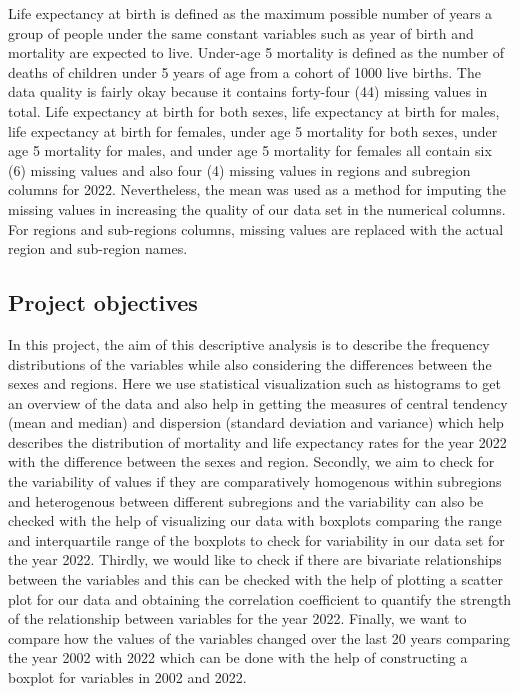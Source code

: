 \documentclass[12 pt]{scrartcl}
\begin{document}
Life expectancy at birth is defined as the maximum possible number of years a group of people under the same constant variables such as year of birth and mortality are expected to live. Under-age 5 mortality is defined as the number of deaths of children under 5 years of age from a cohort of 1000 live births.  The data quality is fairly okay because it contains forty-four (44)  missing values in total. Life expectancy at birth for both sexes, life expectancy at birth for males, life expectancy at birth for females, under age 5 mortality for both sexes, under age 5 mortality for males,  and under age 5 mortality for females all contain six (6) missing values and also four (4) missing values in regions and subregion columns for 2022. Nevertheless, the mean was used as a method for imputing the missing values in increasing the quality of our data set in the numerical columns. For regions and sub-regions columns, missing values are replaced with the actual region and sub-region names.



\subsection{Project objectives}
In this project, the aim of this descriptive analysis is to describe the frequency distributions of the variables while also considering the differences between the sexes and regions. Here we use statistical visualization such as histograms to get an overview of the data and also help in getting the measures of central tendency (mean and median) and dispersion (standard deviation and variance) which help describes the distribution of mortality and life expectancy rates for the year 2022 with the difference between the sexes and region. Secondly, we aim to check for the variability of values if they are comparatively homogenous within subregions and heterogenous between different subregions and the variability can also be checked with the help of visualizing our data with boxplots comparing the range and interquartile range of the boxplots to check for variability in our data set for the year 2022.
Thirdly, we would like to check if there are bivariate relationships between the variables and this can be checked with the help of plotting a scatter plot for our data and obtaining the correlation coefficient to quantify the strength of the relationship between variables for the year 2022.
Finally, we want to compare how the values of the variables changed over the last 20 years comparing the year 2002 with 2022 which can be done with the help of constructing a boxplot for variables in 2002 and 2022.
\end{document}
